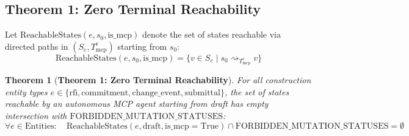 \documentclass[10pt,conference,letterpaper]{article}
\newtheorem{theorem}{Theorem}
\begin{document}
\subsection{Theorem 1: Zero Terminal Reachability}

Let $\text{ReachableStates}(e, s_0, \text{is\_mcp})$ denote the set of states reachable via directed paths in $(S_e, T_{\text{mcp}}^e)$ starting from $s_0$:
\begin{equation}
\text{ReachableStates}(e, s_0, \text{is\_mcp}) = \{ v \in S_e \mid s_0 \rightsquigarrow_{T_{\text{mcp}}^e} v \}
\end{equation}

\begin{theorem}[\textbf{Theorem 1: Zero Terminal Reachability}]
For all construction entity types $e \in \{\text{rfi}, \text{commitment}, \text{change\_event}, \text{submittal}\}$, the set of states reachable by an autonomous MCP agent starting from draft has empty intersection with $\text{FORBIDDEN\_MUTATION\_STATUSES}$:
\begin{equation}
\forall e \in \text{Entities}: \quad \text{ReachableStates}(e, \text{draft}, \text{is\_mcp}=\text{True}) \cap \text{FORBIDDEN\_MUTATION\_STATUSES} = \emptyset
\end{equation}
\end{theorem}
\end{document}
